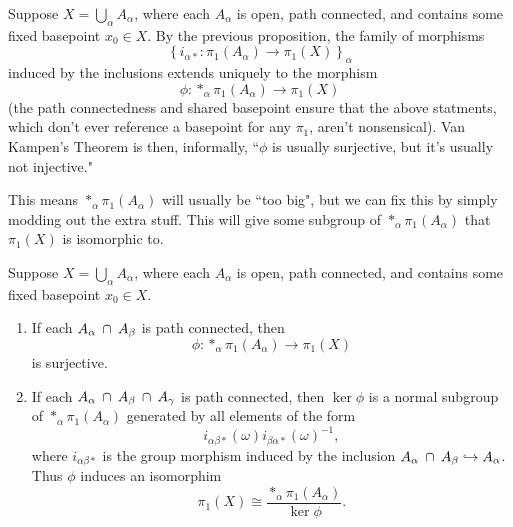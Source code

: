 \documentclass[twoside,10pt]{report}
\begin{document}
Suppose $X = \bigcup_{\alpha}A_{\alpha}$, where each $A_{\alpha}$ is open, path connected, and contains some fixed basepoint $x_0 \in X$. By the previous proposition, the family of morphisms
\[
	\left\{ i_{\alpha *}:\pi_1(A_{\alpha}) \to \pi_1(X) \right\}_{\alpha}
\] induced by the inclusions extends uniquely to the morphism
\[
	\phi:*_{\alpha}\pi_1(A_{\alpha}) \to \pi_1(X)
\] (the path connectedness and shared basepoint ensure that the above statments, which don't ever reference a basepoint for any $\pi_1$, aren't nonsensical). Van Kampen's Theorem is then, informally, ``$\phi$ is usually surjective, but it's usually not injective."

This means $*_{\alpha}\pi_1(A_{\alpha})$ will usually be ``too big", but we can fix this by simply modding out the extra stuff. This will give some subgroup of $*_{\alpha}\pi_1(A_{\alpha})$ that $\pi_1(X)$ is isomorphic to.

\begin{thrm}
	Suppose $X = \bigcup_{\alpha}A_{\alpha}$, where each $A_{\alpha}$ is open, path connected, and contains some fixed basepoint $x_0 \in X$.
	\begin{enumerate}
		\item If each $A_{\alpha}\operatorname{\;\cap\;} A_{\beta}$ is path connected, then
			\[
				\phi: *_{\alpha}\pi_1(A_{\alpha}) \to \pi_1(X)
			\] is surjective.
		\item If each $A_{\alpha}\operatorname{\;\cap\;} A_{\beta} \operatorname{\;\cap\;} A_{\gamma}$ is path connected, then $\ker \phi$ is a normal subgroup of $*_{\alpha}\pi_1(A_{\alpha})$ generated by all elements of the form
			\[
				i_{\alpha\beta*}(\omega) i_{\beta\alpha*}(\omega)^{-1},
			\] where $i_{\alpha\beta*}$ is the group morphism induced by the inclusion $A_{\alpha}\operatorname{\;\cap\;} A_{\beta} \hookrightarrow A_{\alpha}$. Thus $\phi$ induces an isomorphim 
			\[
				\pi_1(X) \cong \frac{*_{\alpha}\pi_1(A_{\alpha})}{\ker \phi} .
			\] 
	\end{enumerate}
\end{thrm}
\end{document}
